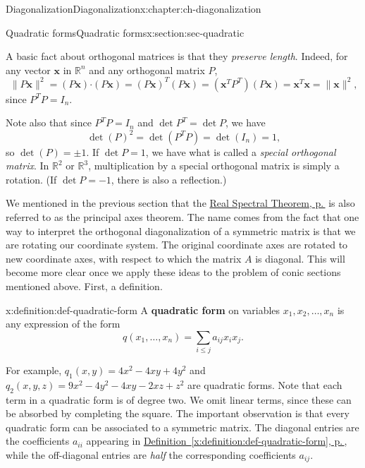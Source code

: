 \documentclass[oneside,10pt,]{book}
\newcommand{\xreffont}{\relax}
\newcommand{\terminology}[1]{\textbf{#1}}
\numberwithin{equation}{section}
\newcommand{\R}{\mathbb{R}}
\newcommand{\dotp}{\!\boldsymbol{\cdot}\!}
\newcommand{\len}[1]{\lVert #1\rVert}
\newcommand{\xx}{\mathbf{x}}
\begin{document}
\begin{chapterptx}{Diagonalization}{}{Diagonalization}{}{}{x:chapter:ch-diagonalization}
\begin{sectionptx}{Quadratic forms}{}{Quadratic forms}{}{}{x:section:sec-quadratic}
\par
A basic fact about orthogonal matrices is that they \emph{preserve length}. Indeed, for any vector \(\xx\) in \(\R^n\) and any orthogonal matrix \(P\),%
\begin{equation*}
\len{P\xx}^2 = (P\xx)\dotp (P\xx) = (P\xx)^T(P\xx) = (\xx^TP^T)(P\xx) = \xx^T\xx=\len{\xx}^2\text{,}
\end{equation*}
since \(P^TP=I_n\).%
\par
Note also that since \(P^TP=I_n\) and \(\det P^T=\det P\), we have%
\begin{equation*}
\det(P)^2=\det(P^TP)=\det(I_n)=1\text{,}
\end{equation*}
so \(\det(P)=\pm 1\). If \(\det P=1\), we have what is called a \emph{special orthogonal matrix}. In \(\R^2\) or \(\R^3\), multiplication by a special orthogonal matrix is simply a rotation. (If \(\det P=-1\), there is also a reflection.)%
\par
We mentioned in the previous section that the \hyperref[x:theorem:thm-real-spectral]{Real Spectral Theorem, p.\,\pageref{x:theorem:thm-real-spectral}} is also referred to as the principal axes theorem. The name comes from the fact that one way to interpret the orthogonal diagonalization of a symmetric matrix is that we are rotating our coordinate system. The original coordinate axes are rotated to new coordinate axes, with respect to which the matrix \(A\) is diagonal. This will become more clear once we apply these ideas to the problem of conic sections mentioned above. First, a definition.%
\begin{definition}{}{x:definition:def-quadratic-form}%
A \terminology{quadratic form} on variables \(x_1, x_2,\ldots, x_n\) is any expression of the form%
\begin{equation*}
q(x_1,\ldots, x_n) = \sum_{i\leq j}a_{ij}x_ix_j\text{.}
\end{equation*}
%
\end{definition}
For example, \(q_1(x,y)=4 x^2-4xy+4y^2\) and \(q_2(x,y,z)=9x^2-4 y^2-4xy-2xz+z^2\) are quadratic forms. Note that each term in a quadratic form is of degree two. We omit linear terms, since these can be absorbed by completing the square. The important observation is that every quadratic form can be associated to a symmetric matrix. The diagonal entries are the coefficients \(a_{ii}\) appearing in \hyperref[x:definition:def-quadratic-form]{Definition~{\xreffont\ref{x:definition:def-quadratic-form}}, p.\,\pageref{x:definition:def-quadratic-form}}, while the off-diagonal entries are \emph{half} the corresponding coefficients \(a_{ij}\).%

\end{sectionptx}
\end{chapterptx}
\end{document}
